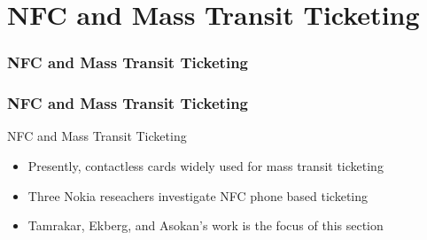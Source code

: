 \documentclass[unknownkeysallowed]{beamer}
\begin{document}
\section{NFC and Mass Transit Ticketing}
\begin{frame}
\frametitle{NFC and Mass Transit Ticketing}
\begin{center}\begin{minipage}{.9\textwidth}
\tableofcontents[currentsubsection, hideothersubsections, sectionstyle=show/shaded]
\end{minipage}\end{center}
\end{frame}
%

\begin{frame}
\frametitle{NFC and Mass Transit Ticketing}
  \begin{center}
  \begin{minipage}{.9\textwidth}
  \begin{block}{NFC and Mass Transit Ticketing}
    \begin{itemize}
      \item{Presently, contactless cards widely used for mass transit ticketing}
      \pause
      \vspace{1mm}
      \item{Three Nokia reseachers investigate NFC phone based ticketing}
      \pause
      \vspace{1mm}
      \item{Tamrakar, Ekberg, and Asokan's work is the focus of this section}
    \end{itemize}
  \end{block}
  \end{minipage}
  \end{center}
\end{frame}
\end{document}
